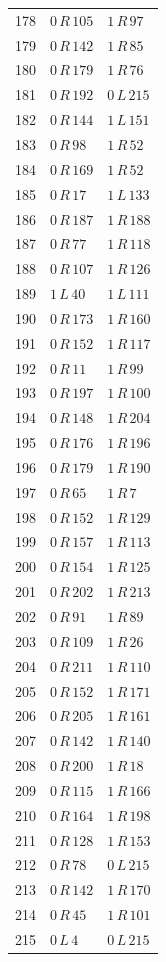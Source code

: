 \begin{longtable}{rll}
178 & $0\,R\,105$ & $1\,R\,97$ \\
179 & $0\,R\,142$ & $1\,R\,85$ \\
180 & $0\,R\,179$ & $1\,R\,76$ \\
181 & $0\,R\,192$ & $0\,L\,215$ \\
182 & $0\,R\,144$ & $1\,L\,151$ \\
183 & $0\,R\,98$ & $1\,R\,52$ \\
184 & $0\,R\,169$ & $1\,R\,52$ \\
185 & $0\,R\,17$ & $1\,L\,133$ \\
186 & $0\,R\,187$ & $1\,R\,188$ \\
187 & $0\,R\,77$ & $1\,R\,118$ \\
188 & $0\,R\,107$ & $1\,R\,126$ \\
189 & $1\,L\,40$ & $1\,L\,111$ \\
190 & $0\,R\,173$ & $1\,R\,160$ \\
191 & $0\,R\,152$ & $1\,R\,117$ \\
192 & $0\,R\,11$ & $1\,R\,99$ \\
193 & $0\,R\,197$ & $1\,R\,100$ \\
194 & $0\,R\,148$ & $1\,R\,204$ \\
195 & $0\,R\,176$ & $1\,R\,196$ \\
196 & $0\,R\,179$ & $1\,R\,190$ \\
197 & $0\,R\,65$ & $1\,R\,7$ \\
198 & $0\,R\,152$ & $1\,R\,129$ \\
199 & $0\,R\,157$ & $1\,R\,113$ \\
200 & $0\,R\,154$ & $1\,R\,125$ \\
201 & $0\,R\,202$ & $1\,R\,213$ \\
202 & $0\,R\,91$ & $1\,R\,89$ \\
203 & $0\,R\,109$ & $1\,R\,26$ \\
204 & $0\,R\,211$ & $1\,R\,110$ \\
205 & $0\,R\,152$ & $1\,R\,171$ \\
206 & $0\,R\,205$ & $1\,R\,161$ \\
207 & $0\,R\,142$ & $1\,R\,140$ \\
208 & $0\,R\,200$ & $1\,R\,18$ \\
209 & $0\,R\,115$ & $1\,R\,166$ \\
210 & $0\,R\,164$ & $1\,R\,198$ \\
211 & $0\,R\,128$ & $1\,R\,153$ \\
212 & $0\,R\,78$ & $0\,L\,215$ \\
213 & $0\,R\,142$ & $1\,R\,170$ \\
214 & $0\,R\,45$ & $1\,R\,101$ \\
215 & $0\,L\,4$ & $0\,L\,215$ \\
\bottomrule
\end{longtable}

